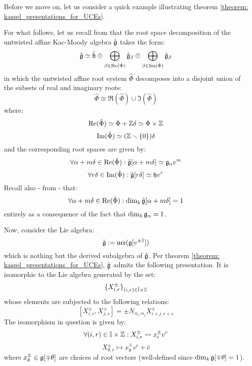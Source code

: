         Before we move on, let us consider a quick example illustrating theorem \ref{theorem: kassel_presentations_for_UCEs}.
        \begin{example}
            For what follows, let us recall from \cite[Chapter 7]{kac_infinite_dimensional_lie_algebras} that the root space decomposition of the untwisted affine Kac-Moody algebra $\hat{\mathfrak{g}}$ takes the form:
                $$\hat{\mathfrak{g}} \simeq \hat{\mathfrak{h}} \oplus \bigoplus_{\beta \in \operatorname{Re}(\hat{\Phi})} \hat{\mathfrak{g}}_{\beta} \oplus \bigoplus_{\beta \in \operatorname{Im}(\hat{\Phi})} \hat{\mathfrak{g}}_{\beta}$$
            in which the untwisted affine root system $\hat{\Phi}$ decomposes into a disjoint union of the subsets of real and imaginary roots:
                $$\hat{\Phi} \cong \Re(\hat{\Phi}) \cup \Im(\hat{\Phi})$$
            where:
                $$\Re(\hat{\Phi}) \cong \Phi + \Z\delta \cong \Phi \x \Z$$
                $$\operatorname{Im}(\hat{\Phi}) \simeq (\mathbb{Z} \smallsetminus \{0\})\delta$$
            and the corresponding root spaces are given by:
                $$\forall \alpha + m\delta \in \operatorname{Re}(\hat{\Phi}): \hat{\mathfrak{g}}[\alpha + m\delta] \simeq \mathfrak{g}_{\alpha} v^m$$
                $$\forall r\delta \in \operatorname{Im}(\hat{\Phi}): \hat{\mathfrak{g}}[r\delta] \simeq \mathfrak{h} v^r$$
            Recall also - from \cite[Chapter 5]{kac_infinite_dimensional_lie_algebras} - that:
                $$\forall \alpha + m \delta \in \operatorname{Re}(\hat{\Phi}): \dim_k \hat{\mathfrak{g}}[\alpha + m\delta] = 1$$
            entirely as a consequence of the fact that $\dim_k \mathfrak{g}_{\alpha} = 1$. 
        
            Now, consider the Lie algebra:
                $$\tilde{\mathfrak{g}} := \mathfrak{uce}(\mathfrak{g}[v^{\pm 1}])$$
            which is nothing but the derived subalgebra of $\hat{\mathfrak{g}}$. Per theorem \ref{theorem: kassel_presentations_for_UCEs}, $\tilde{\mathfrak{g}}$ admits the following presentation. It is isomorphic to the Lie algebra generated by the set:
                $$\{ X_{i, r}^{\pm} \}_{(i, r) \in \hat{\simpleroots} \x \Z}$$
            whose elements are subjected to the following relations:
                $$[X_{i, r}^{\pm}, X_{j, s}^{\pm}] = \pm N_{\alpha_i, \alpha_j} X_{i + j, r + s}^{\pm}$$
            The isomorphism in question is given by:
                $$\forall (i, r) \in \simpleroots \x \Z: X_{i, r}^{\pm} \mapsto x_i^{\pm} v^r$$
                $$X_{\theta, r}^{\pm} \mapsto x_{\theta}^{\mp} v^r + \hat{c}$$
            where $x_{\theta}^{\mp} \in \mathfrak{g}[\mp \theta]$ are choices of root vectors (well-defined since $\dim_k \mathfrak{g}[\mp \theta] = 1$).
        \end{example}

